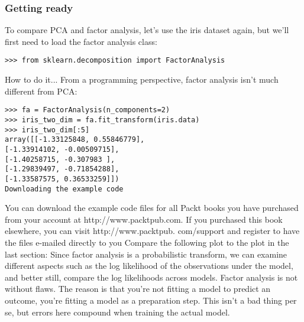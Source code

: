 \documentclass[SKL-MASTER.tex]{subfiles}
\begin{document}
\subsubsection{Getting ready}
To compare PCA and factor analysis, let's use the iris dataset again, but we'll first need to
load the factor analysis class:
\begin{framed}
\begin{verbatim}
>>> from sklearn.decomposition import FactorAnalysis
\end{verbatim}
\end{framed}
How to do it...
From a programming perspective, factor analysis isn't much different from PCA:
\begin{framed}
	\begin{verbatim}
>>> fa = FactorAnalysis(n_components=2)
>>> iris_two_dim = fa.fit_transform(iris.data)
>>> iris_two_dim[:5]
array([[-1.33125848, 0.55846779],
[-1.33914102, -0.00509715],
[-1.40258715, -0.307983 ],
[-1.29839497, -0.71854288],
[-1.33587575, 0.36533259]])
Downloading the example code
\end{verbatim}
\end{framed}
You can download the example code files for all Packt books you have
purchased from your account at http://www.packtpub.com. If you
purchased this book elsewhere, you can visit http://www.packtpub.
com/support and register to have the files e-mailed directly to you
Compare the following plot to the plot in the last section:
Since factor analysis is a probabilistic transform, we can examine different aspects such
as the log likelihood of the observations under the model, and better still, compare the log
likelihoods across models.
Factor analysis is not without flaws. The reason is that you're not fitting a model to predict
an outcome, you're fitting a model as a preparation step. This isn't a bad thing per se, but
errors here compound when training the actual model.
\newpage
\end{document}
